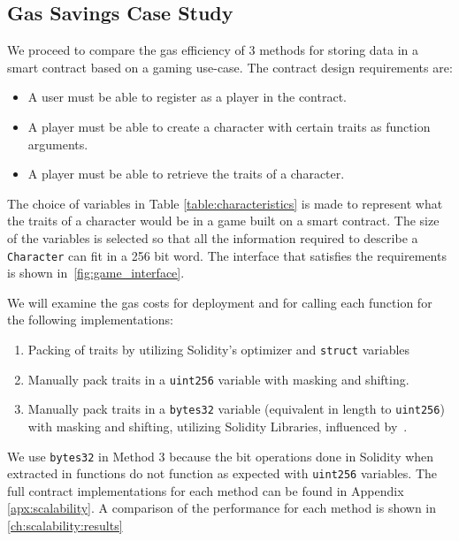\subsection{Gas Savings Case Study}

We proceed to compare the gas efficiency of 3 methods for storing data in a smart contract based on a gaming use-case. The contract design requirements are: 
\begin{itemize}
    \item A user must be able to register as a player in the contract.
    \item A player must be able to create a character with certain traits as function arguments.
    \item A player must be able to retrieve the traits of a character.
\end{itemize}




The choice of variables in Table \ref{table:characteristics} is made to represent what the traits of a character would be in a game built on a smart contract. The size of the variables is selected so that all the information required to describe a \texttt{Character} can fit in a 256 bit word. The interface that satisfies the requirements is shown in~\ref{fig:game_interface}.

We will examine the gas costs for deployment and for calling each function for the following implementations:

\begin{enumerate}
    \item Packing of traits by utilizing Solidity's optimizer and \texttt{struct} variables
    \item Manually pack traits in a \texttt{uint256} variable with masking and shifting.
    \item Manually pack traits in a \texttt{bytes32} variable (equivalent in length to \texttt{uint256}) with masking and shifting, utilizing Solidity Libraries, influenced by~\cite{virtualstruct}.
\end{enumerate}
We use \texttt{bytes32} in Method 3 because the bit operations done in Solidity when extracted in functions do not function as expected with \texttt{uint256} variables. The full contract implementations for each method can be found in Appendix \ref{apx:scalability}. A comparison of the performance for each method is shown in \ref{ch:scalability:results}%

